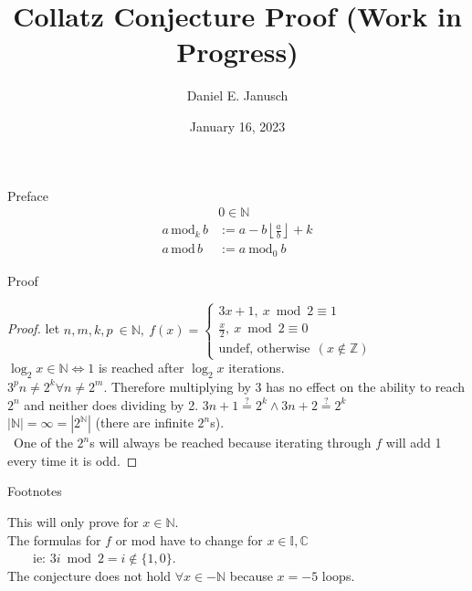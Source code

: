 \documentclass[12pt]{article}
\begin{document}
\title{Collatz Conjecture Proof (Work in Progress)}
\author{Daniel E. Janusch}
\date{January 16, 2023} %
\maketitle

\begin{section}{Preface}\label{sec:preface}
	\begin{align}
		& 0\in\mathbb N\\
		a\,\text{mod}_k\,b & :=a-b\left\lfloor\frac ab\right\rfloor+k\\
		a\,\text{mod}\,b & := a~\text{mod}_0~b
	\end{align}
\end{section}

\begin{section}{Proof}
	\begin{proof}
		let $n,m,k,p~\in\mathbb N,~f(x)=\begin{cases}
			3x+1,~x\bmod2\equiv1\\
			\frac x2,~x\bmod2\equiv0\\
			\text{undef, otherwise}~~(x\notin\mathbb Z)
		\end{cases}$\\
		$\log_2x\in\mathbb N\Longleftrightarrow1$ is reached after $\log_2x$ iterations.\\
		$3^pn\ne2^k\forall n\ne2^m$. Therefore multiplying by 3 has no effect on the ability to reach $2^n$
		and neither does dividing by 2.
		$3n+1\stackrel?=2^k\land3n+2\stackrel?=2^k$~\therefore~\\
		$\left|\mathbb N\right|=\infty=\left|2^\mathbb N\right|$ (there are infinite $2^n$s).\\\
		One of the $2^n$s will always be reached because iterating through $f$ will add 1 every time it is odd.
	\end{proof}
\end{section}

\begin{section}{Footnotes}\label{sec:footnotes}

	This will only prove for $x\in\mathbb N$.\\
	The formulas for $f$ or mod have to change for $x\in\mathbb I,\mathbb C$\\
	~~~~ie: $3i\bmod2=i\notin\{1,0\}$.\\
	The conjecture does not hold $\forall x\in-\mathbb N$ because $x=-5$ loops.
\end{section}
\end{document}
